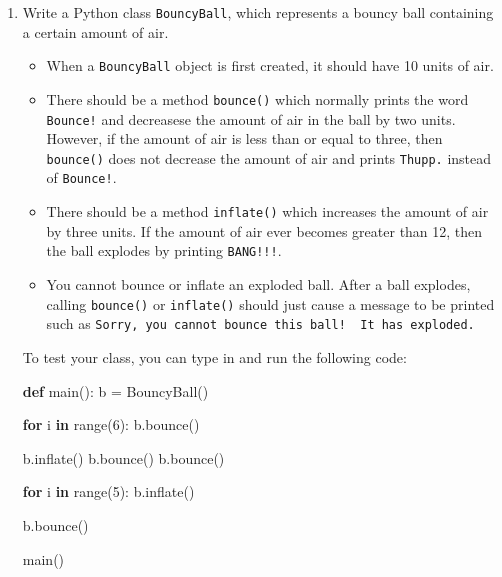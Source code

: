 \documentclass[]{article}
\newenvironment{Shaded}{}{}
\newcommand{\KeywordTok}[1]{\textcolor[rgb]{0.00,0.44,0.13}{\textbf{#1}}}
\newcommand{\DecValTok}[1]{\textcolor[rgb]{0.25,0.63,0.44}{#1}}
\newcommand{\ControlFlowTok}[1]{\textcolor[rgb]{0.00,0.44,0.13}{\textbf{#1}}}
\newcommand{\OperatorTok}[1]{\textcolor[rgb]{0.40,0.40,0.40}{#1}}
\newcommand{\BuiltInTok}[1]{#1}
\newcommand{\NormalTok}[1]{#1}
\providecommand{\tightlist}{%
  \setlength{\itemsep}{0pt}\setlength{\parskip}{0pt}}
\begin{document}
\begin{enumerate}
\def\labelenumi{\arabic{enumi}.}
\item
  Write a Python class \texttt{BouncyBall}, which represents a bouncy
  ball containing a certain amount of air.

  \begin{itemize}
  \tightlist
  \item
    When a \texttt{BouncyBall} object is first created, it should have
    10 units of air.
  \item
    There should be a method \texttt{bounce()} which normally prints the
    word \texttt{Bounce!} and decreasese the amount of air in the ball
    by two units. However, if the amount of air is less than or equal to
    three, then \texttt{bounce()} does not decrease the amount of air
    and prints \texttt{Thupp.} instead of \texttt{Bounce!}.
  \item
    There should be a method \texttt{inflate()} which increases the
    amount of air by three units. If the amount of air ever becomes
    greater than 12, then the ball explodes by printing
    \texttt{BANG!!!}.
  \item
    You cannot bounce or inflate an exploded ball. After a ball
    explodes, calling \texttt{bounce()} or \texttt{inflate()} should
    just cause a message to be printed such as
    \texttt{Sorry,\ you\ cannot\ bounce\ this\ ball!\ \ It\ has\ exploded.}
  \end{itemize}

  To test your class, you can type in and run the following code:

\begin{Shaded}
\begin{Highlighting}[]
\KeywordTok{def}\NormalTok{ main():}
\NormalTok{    b }\OperatorTok{=}\NormalTok{ BouncyBall()}

    \ControlFlowTok{for}\NormalTok{ i }\KeywordTok{in} \BuiltInTok{range}\NormalTok{(}\DecValTok{6}\NormalTok{):}
\NormalTok{        b.bounce()}

\NormalTok{    b.inflate()}
\NormalTok{    b.bounce()}
\NormalTok{    b.bounce()}

    \ControlFlowTok{for}\NormalTok{ i }\KeywordTok{in} \BuiltInTok{range}\NormalTok{(}\DecValTok{5}\NormalTok{):}
\NormalTok{        b.inflate()}

\NormalTok{    b.bounce()}

\NormalTok{main()}
\end{Highlighting}
\end{Shaded}


\end{enumerate}
\end{document}

